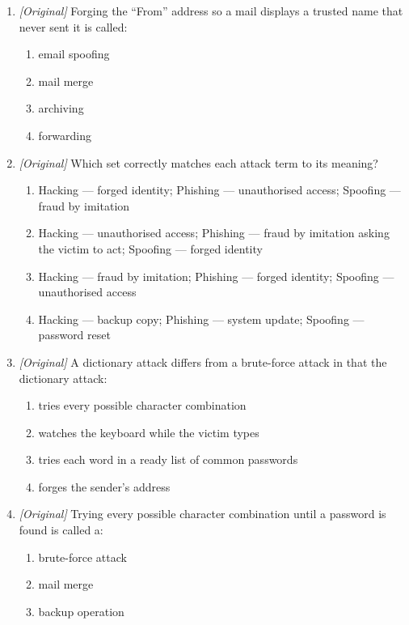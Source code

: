\documentclass[11pt]{article}
\begin{document}
\begin{enumerate}[label=\textbf{Q\arabic*.}, leftmargin=*]
\begin{enumerate}[label=\Alph*.]
    \item caching
    \item compiling
  \end{enumerate}
\item \textit{[Original]} Forging the ``From'' address so a mail displays
  a trusted name that never sent it is called:
  \begin{enumerate}[label=\Alph*.]
    \item email spoofing
    \item mail merge
    \item archiving
    \item forwarding
  \end{enumerate}
\item \textit{[Original]} Which set correctly matches each attack term to
  its meaning?
  \begin{enumerate}[label=\Alph*.]
    \item Hacking --- forged identity; Phishing --- unauthorised access; Spoofing --- fraud by imitation
    \item Hacking --- unauthorised access; Phishing --- fraud by imitation asking the victim to act; Spoofing --- forged identity
    \item Hacking --- fraud by imitation; Phishing --- forged identity; Spoofing --- unauthorised access
    \item Hacking --- backup copy; Phishing --- system update; Spoofing --- password reset
  \end{enumerate}
\item \textit{[Original]} A dictionary attack differs from a brute-force
  attack in that the dictionary attack:
  \begin{enumerate}[label=\Alph*.]
    \item tries every possible character combination
    \item watches the keyboard while the victim types
    \item tries each word in a ready list of common passwords
    \item forges the sender's address
  \end{enumerate}
\item \textit{[Original]} Trying every possible character combination until
  a password is found is called a:
  \begin{enumerate}[label=\Alph*.]
    \item brute-force attack
    \item mail merge
    \item backup operation

\end{enumerate}
\end{enumerate}
\end{document}
